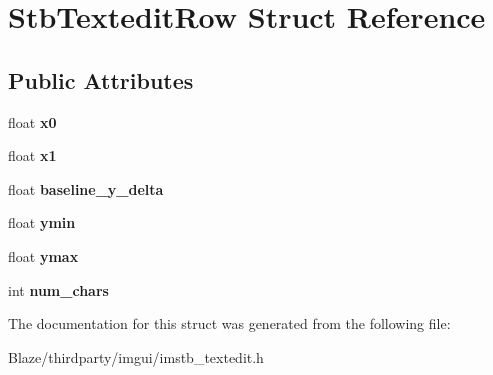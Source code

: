 \hypertarget{structStbTexteditRow}{}\section{Stb\+Textedit\+Row Struct Reference}
\label{structStbTexteditRow}
\subsection*{Public Attributes}
\begin{DoxyCompactItemize}
\item 
\mbox{\label{structStbTexteditRow_af30b3e1d61d1acea26d3e0ebec2cb81d}} 
float {\bfseries x0}
\item 
\mbox{\label{structStbTexteditRow_a3a3e1a506030c871a1b3d09bf26e341f}} 
float {\bfseries x1}
\item 
\mbox{\label{structStbTexteditRow_ad2d72b74b1a61e331949c7f7ec311880}} 
float {\bfseries baseline\+\_\+y\+\_\+delta}
\item 
\mbox{\label{structStbTexteditRow_a707d331bd9dc99d64c81f71106b75eed}} 
float {\bfseries ymin}
\item 
\mbox{\label{structStbTexteditRow_aab290e15f6a3b4a96ab2c2472cc8a7a5}} 
float {\bfseries ymax}
\item 
\mbox{\label{structStbTexteditRow_a1a19bebadb3f82b4f86ea29698d77084}} 
int {\bfseries num\+\_\+chars}
\end{DoxyCompactItemize}


The documentation for this struct was generated from the following file\+:\begin{DoxyCompactItemize}
\item 
Blaze/thirdparty/imgui/imstb\+\_\+textedit.\+h\end{DoxyCompactItemize}
